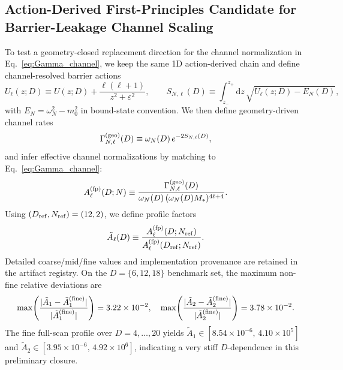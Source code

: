 \documentclass[aps,prd,onecolumn,notitlepage,nofootinbib,superscriptaddress,11pt,floatfix]{revtex4-2}
\newcommand{\dd}{\mathrm{d}}
\begin{document}
\subsection{Action-Derived First-Principles Candidate for Barrier-Leakage Channel Scaling}
\label{app:superrad_candidate}
To test a geometry-closed replacement direction for the channel normalization in Eq.~\eqref{eq:Gamma_channel}, we keep the same 1D action-derived chain and define channel-resolved barrier actions
\begin{equation}
U_\ell(z;D)\equiv U(z;D)+\frac{\ell(\ell+1)}{z^2+\varepsilon^2},\qquad
S_{N,\ell}(D)\equiv\int_{z_-}^{z_+}\dd z\,\sqrt{U_\ell(z;D)-E_N(D)},
\end{equation}
with $E_N=\omega_N^2-m_0^2$ in bound-state convention.
We then define geometry-driven channel rates
\begin{equation}
\Gamma_{N,\ell}^{\rm(geo)}(D)\equiv \omega_N(D)\,e^{-2S_{N,\ell}(D)},
\end{equation}
and infer effective channel normalizations by matching to Eq.~\eqref{eq:Gamma_channel}:
\begin{equation}
A_\ell^{\rm(fp)}(D;N)\equiv
\frac{\Gamma_{N,\ell}^{\rm(geo)}(D)}{\omega_N(D)\,(\omega_N(D)M_*)^{4\ell+4}}.
\end{equation}
Using $(D_{\rm ref},N_{\rm ref})=(12,2)$, we define profile factors
\begin{equation}
\tilde A_\ell(D)\equiv \frac{A_\ell^{\rm(fp)}(D;N_{\rm ref})}{A_\ell^{\rm(fp)}(D_{\rm ref};N_{\rm ref})}.
\label{eq:superrad_A_profile}
\end{equation}
Detailed coarse/mid/fine values and implementation provenance are retained in the artifact registry. On the $D=\{6,12,18\}$ benchmark set, the maximum non-fine relative deviations are
\begin{equation}
\max\!\left(\frac{|\tilde A_1-\tilde A_1^{\rm(fine)}|}{|\tilde A_1^{\rm(fine)}|}\right)=3.22\times10^{-2},\quad
\max\!\left(\frac{|\tilde A_2-\tilde A_2^{\rm(fine)}|}{|\tilde A_2^{\rm(fine)}|}\right)=3.78\times10^{-2}.
\end{equation}
The fine full-scan profile over $D=4,\dots,20$ yields $\tilde A_1\in[8.54\times10^{-6},\,4.10\times10^5]$ and $\tilde A_2\in[3.95\times10^{-6},\,4.92\times10^6]$, indicating a very stiff $D$-dependence in this preliminary closure.
\end{document}
